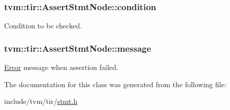 \subsubsection[{\texorpdfstring{condition}{condition}}]{ tvm\+::tir\+::\+Assert\+Stmt\+Node\+::condition}\hypertarget{classtvm_1_1tir_1_1AssertStmtNode_a016ff228d0c944b8d295223f54858493}{}\label{classtvm_1_1tir_1_1AssertStmtNode_a016ff228d0c944b8d295223f54858493}


Condition to be checked. 

\subsubsection[{\texorpdfstring{message}{message}}]{ tvm\+::tir\+::\+Assert\+Stmt\+Node\+::message}\hypertarget{classtvm_1_1tir_1_1AssertStmtNode_a42ff732b4df33bddf74f9a92669cebb9}{}\label{classtvm_1_1tir_1_1AssertStmtNode_a42ff732b4df33bddf74f9a92669cebb9}


\hyperlink{classtvm_1_1Error}{Error} message when assertion failed. 



The documentation for this class was generated from the following file\+:\begin{DoxyCompactItemize}
\item 
include/tvm/tir/\hyperlink{stmt_8h}{stmt.\+h}\end{DoxyCompactItemize}
